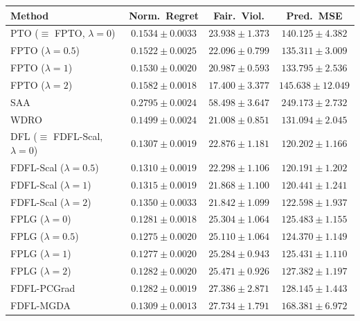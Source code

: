 \documentclass[ijoc,sglanonrev]{informs4}
\begin{document}
\begin{table}[htbp]
\smallskip
\begin{tabular}{l ccc}
\toprule
Method & Norm.\ Regret & Fair.\ Viol. & Pred.\ MSE \\
\midrule
PTO ($\equiv$ FPTO, $\lambda\!=\!0$)      & $0.1534 \pm 0.0033$ & $23.938 \pm 1.373$ & $140.125 \pm 4.382$ \\
FPTO ($\lambda\!=\!0.5$)                  & $0.1522 \pm 0.0025$ & $22.096 \pm 0.799$ & $135.311 \pm 3.009$ \\
FPTO ($\lambda\!=\!1$)                    & $0.1530 \pm 0.0020$ & $20.987 \pm 0.593$ & $\mathbf{133.795 \pm 2.536}$ \\
FPTO ($\lambda\!=\!2$)                    & $0.1582 \pm 0.0018$ & $\mathbf{17.400 \pm 3.377}$ & $145.638 \pm 12.049$ \\
\midrule
SAA                                       & $0.2795 \pm 0.0024$ & $58.498 \pm 3.647$ & $249.173 \pm 2.732$ \\
WDRO                                      & $0.1499 \pm 0.0024$ & $21.008 \pm 0.851$ & $131.094 \pm 2.045$ \\
\midrule
DFL ($\equiv$ FDFL-Scal, $\lambda\!=\!0$) & $0.1307 \pm 0.0019$ & $22.876 \pm 1.181$ & $\mathbf{120.202 \pm 1.166}$ \\
FDFL-Scal ($\lambda\!=\!0.5$)             & $0.1310 \pm 0.0019$ & $22.298 \pm 1.106$ & $120.191 \pm 1.202$ \\
FDFL-Scal ($\lambda\!=\!1$)               & $0.1315 \pm 0.0019$ & $21.868 \pm 1.100$ & $120.441 \pm 1.241$ \\
FDFL-Scal ($\lambda\!=\!2$)               & $0.1350 \pm 0.0033$ & $21.842 \pm 1.099$ & $122.598 \pm 1.937$ \\
\midrule
FPLG ($\lambda\!=\!0$)                    & $0.1281 \pm 0.0018$ & $25.304 \pm 1.064$ & $125.483 \pm 1.155$ \\
FPLG ($\lambda\!=\!0.5$)                  & $\mathbf{0.1275 \pm 0.0020}$ & $25.110 \pm 1.064$ & $124.370 \pm 1.149$ \\
FPLG ($\lambda\!=\!1$)                    & $0.1277 \pm 0.0020$ & $25.284 \pm 0.943$ & $125.431 \pm 1.110$ \\
FPLG ($\lambda\!=\!2$)                    & $0.1282 \pm 0.0020$ & $25.471 \pm 0.926$ & $127.382 \pm 1.197$ \\
\midrule
FDFL-PCGrad                               & $0.1282 \pm 0.0019$ & $27.386 \pm 2.871$ & $128.145 \pm 1.443$ \\
FDFL-MGDA                                 & $0.1309 \pm 0.0013$ & $27.734 \pm 1.791$ & $168.381 \pm 6.972$ \\
\bottomrule
\end{tabular}

\end{table}
\end{document}
